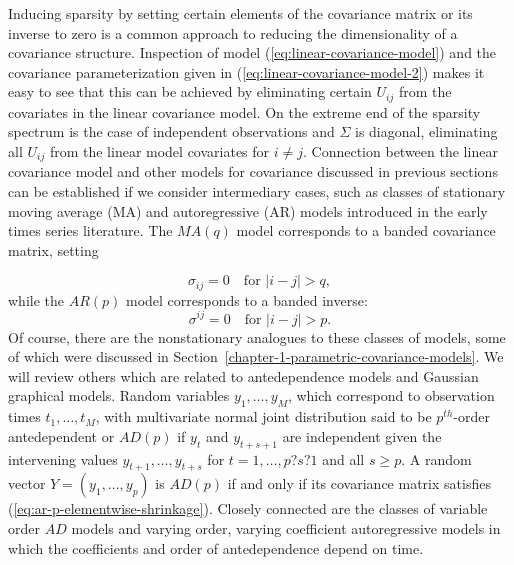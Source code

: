 \bigskip

Inducing sparsity by setting certain elements of the covariance matrix or its inverse to zero is a common approach to reducing the dimensionality of a covariance structure. Inspection of model (\ref{eq:linear-covariance-model}) and the covariance parameterization given in (\ref{eq:linear-covariance-model-2}) makes it easy to see that this can be achieved by eliminating certain $U_{ij}$ from the covariates in the linear covariance model. On the extreme end of the sparsity spectrum is the case of independent observations and $\Sigma$ is diagonal, eliminating all $U_{ij}$ from the linear model covariates for $i \ne j$. Connection between the linear covariance model and other models for covariance discussed in previous sections can be established if we consider intermediary cases, such as classes of stationary moving average (MA) and autoregressive (AR) models introduced in the early times series literature. The $MA(q)$ model corresponds to a banded covariance matrix, setting 

\begin{equation}  \label{eq:ar-p-elementwise-shrinkage}
\sigma_{ij} = 0 \quad \mbox{for }\vert i - j \vert > q, 
\end{equation}
\noindent
while the $AR(p)$ model corresponds to a banded inverse:
\begin{equation} \label{eq:ar-p-elementwise-shrinkage}
\sigma^{ij} = 0 \quad \mbox{for }\vert i - j \vert > p. 
\end{equation}
Of course, there are the nonstationary analogues to these classes of models, some of which were discussed in Section~\ref{chapter-1-parametric-covariance-models}. We will review others which are related to antedependence models and Gaussian graphical models. Random variables $y_1, \dots, y_M$, which correspond to observation times $t_1,\dots, t_M$, with multivariate normal joint distribution said to be $p^{th}$-order antedependent or $AD(p)$ \cite{gabriel1962ante} if $y_t$ and $y_{t+s+1}$ are independent given the intervening values $y_{t+1}, \dots , y_{t+s}$ for $t = 1, \dots , p?s?1$ and all $s \ge p$. A random vector $Y = \left(y_1, \dots , y_p\right)$ is $AD(p)$ if and only if its covariance matrix satisfies (\ref{eq:ar-p-elementwise-shrinkage}). Closely connected are the classes of variable order $AD$ models and varying order, varying coefficient autoregressive models \cite{kitagawa1985smoothness} in which the coefficients and order of antedependence depend on time. 




